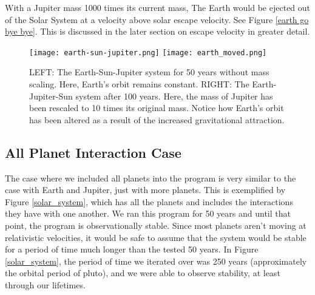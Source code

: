 \documentclass{article}
\begin{document}
With a Jupiter mass 1000 times its current mass, The Earth would be ejected out of the Solar System at a velocity above solar escape velocity. See Figure \ref{earth go bye bye}. This is discussed in the later section on escape velocity in greater detail.

\begin{figure}[t!]


\texttt{[image: earth-sun-jupiter.png]}
\texttt{[image: earth\_moved.png]}
\caption{LEFT: The Earth-Sun-Jupiter system for 50 years without mass scaling. Here, Earth's orbit remains constant.
RIGHT: The Earth-Jupiter-Sun system after 100 years. Here, the mass of Jupiter has been rescaled to 10 times its original mass. Notice how Earth's orbit has been altered as a result of the increased gravitational attraction.}
\label{earth_wobble}
\end{figure}

\subsection{All Planet Interaction Case}
The case where we included all planets into the program is very similar to the case with Earth and Jupiter, just with more planets. This is exemplified by Figure \ref{solar_system}, which has all the planets and includes the interactions they have with one another. We ran this program for 50 years and until that point, the program is observationally stable. Since most planets aren't moving at relativistic velocities, it would be safe to assume that the system would be stable for a period of time much longer than the tested 50 years. In Figure \ref{solar_system}, the period of time we iterated over was 250 years (approximately the orbital period of pluto), and we were able to observe stability, at least through our lifetimes.
\end{document}
